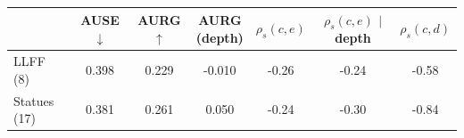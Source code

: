 \begin{tabular}{@{}lcccccc@{}}
\toprule
 & AUSE$\downarrow$ & AURG$\uparrow$ & \makecell{AURG\\(depth)} & $\rho_s(c,e)$ & \makecell{$\rho_s(c,e)$\\$|$depth} & $\rho_s(c,d)$ \\
\midrule
LLFF (8) & 0.398 & 0.229 & -0.010 & -0.26 & -0.24 & -0.58 \\
Statues (17) & 0.381 & 0.261 & 0.050 & -0.24 & -0.30 & -0.84 \\
\bottomrule
\end{tabular}
